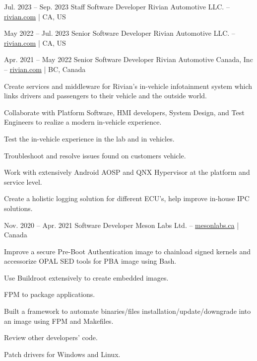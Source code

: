 \vspace*{6pt}


\tightentry
{Jul. 2023 -- Sep. 2023}
{Staff Software Developer}
{Rivian Automotive LLC. -- \href{https://rivian.com/}{rivian.com} | CA, US}

\tightentry
{May 2022 -- Jul. 2023}
{Senior Software Developer}
{Rivian Automotive LLC. -- \href{https://rivian.com/}{rivian.com} | CA, US}

\entrys
{Apr. 2021 -- May 2022}
{Senior Software Developer}
{Rivian Automotive Canada, Inc -- \href{https://rivian.com/}{rivian.com} | BC, Canada}{
	Create services and middleware for Rivian's in-vehicle infotainment system which links drivers and passengers to their vehicle and the outside world.
	\begin{tightemize}
		\item Collaborate with Platform Software, HMI developers, System Design, and Test Engineers to realize a modern in-vehicle experience.
		\item Test the in-vehicle experience in the lab and in vehicles.
		\item Troubleshoot and resolve issues found on customers vehicle.
		\item Work with extensively Android AOSP and QNX Hypervisor at the platform and service level.
		\item Create a holistic logging solution for different ECU's, help improve in-house IPC solutions.
	\end{tightemize}
}

\entrys
{Nov. 2020 -- Apr. 2021}
{Software Developer}
{Meson Labs Ltd. -- \href{https://www.mesonlabs.ca/}{mesonlabs.ca} | Canada}{
	Improve a secure Pre-Boot Authentication image to chainload signed kernels and accessorize OPAL SED tools for PBA image using Bash.
	\begin{tightemize}
		\item Use Buildroot extensively to create embedded images.
		\item FPM to package applications.
		\item Built a framework to automate binaries/files installation/update/downgrade into an image using FPM and Makefiles.
		\item Review other developers' code.
		\item Patch drivers for Windows and Linux.
	\end{tightemize}
}

